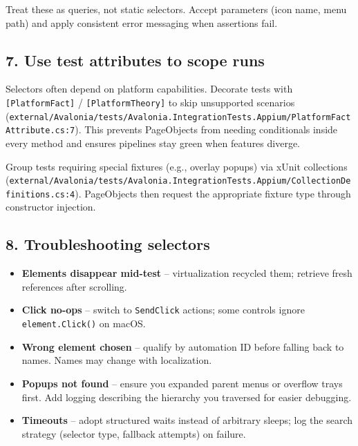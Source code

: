 Treat these as queries, not static selectors. Accept parameters (icon
name, menu path) and apply consistent error messaging when assertions
fail.

\subsection{7. Use test attributes to scope
runs}\label{use-test-attributes-to-scope-runs}

Selectors often depend on platform capabilities. Decorate tests with
\passthrough{\lstinline![PlatformFact]!} /
\passthrough{\lstinline![PlatformTheory]!} to skip unsupported scenarios
(\passthrough{\lstinline!external/Avalonia/tests/Avalonia.IntegrationTests.Appium/PlatformFactAttribute.cs:7!}).
This prevents PageObjects from needing conditionals inside every method
and ensures pipelines stay green when features diverge.

Group tests requiring special fixtures (e.g., overlay popups) via xUnit
collections
(\passthrough{\lstinline!external/Avalonia/tests/Avalonia.IntegrationTests.Appium/CollectionDefinitions.cs:4!}).
PageObjects then request the appropriate fixture type through
constructor injection.

\subsection{8. Troubleshooting
selectors}\label{troubleshooting-selectors}

\begin{itemize}
\tightlist
\item
  \textbf{Elements disappear mid-test} -- virtualization recycled them;
  retrieve fresh references after scrolling.
\item
  \textbf{Click no-ops} -- switch to \passthrough{\lstinline!SendClick!}
  actions; some controls ignore
  \passthrough{\lstinline!element.Click()!} on macOS.
\item
  \textbf{Wrong element chosen} -- qualify by automation ID before
  falling back to names. Names may change with localization.
\item
  \textbf{Popups not found} -- ensure you expanded parent menus or
  overflow trays first. Add logging describing the hierarchy you
  traversed for easier debugging.
\item
  \textbf{Timeouts} -- adopt structured waits instead of arbitrary
  sleeps; log the search strategy (selector type, fallback attempts) on
  failure.
\end{itemize}

